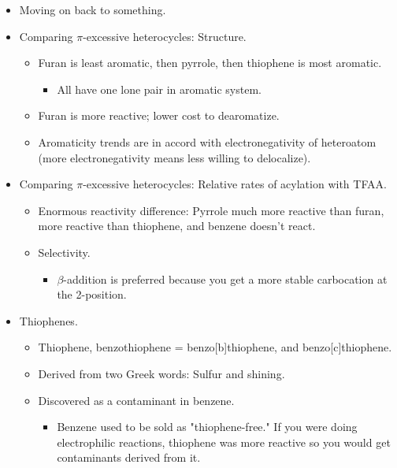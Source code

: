 \documentclass[../notes.tex]{subfiles}
\begin{document}
\begin{itemize}
\begin{itemize}
    \end{itemize}
    \item Moving on back to something.
    \item Comparing $\pi$-excessive heterocycles: Structure.
    \begin{itemize}
        \item Furan is least aromatic, then pyrrole, then thiophene is most aromatic.
        \begin{itemize}
            \item All have one lone pair in aromatic system.
        \end{itemize}
        \item Furan is more reactive; lower cost to dearomatize.
        \item Aromaticity trends are in accord with electronegativity of heteroatom (more electronegativity means less willing to delocalize).
    \end{itemize}
    \item Comparing $\pi$-excessive heterocycles: Relative rates of acylation with TFAA.
    \begin{itemize}
        \item Enormous reactivity difference: Pyrrole much more reactive than furan, more reactive than thiophene, and benzene doesn't react.
        \item Selectivity.
        \begin{itemize}
            \item $\beta$-addition is preferred because you get a more stable carbocation at the 2-position.
        \end{itemize}
    \end{itemize}
    \item Thiophenes.
    \begin{itemize}
        \item Thiophene, benzothiophene = benzo[b]thiophene, and benzo[c]thiophene.
        \item Derived from two Greek words: Sulfur and shining.
        \item Discovered as a contaminant in benzene.
        \begin{itemize}
            \item Benzene used to be sold as "thiophene-free." If you were doing electrophilic reactions, thiophene was more reactive so you would get contaminants derived from it.
        \end{itemize}
    \end{itemize}

\end{itemize}
\end{document}
